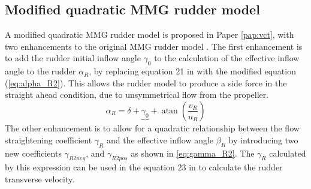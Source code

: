 \subsection{Modified quadratic MMG rudder model}
A modified quadratic MMG rudder model is proposed in Paper \ref{pap:vct}, with two enhancements to the original MMG rudder model \cite{yasukawa_introduction_2015}. The first enhancement is to add the rudder initial inflow angle $\gamma_0$ to the calculation of the effective inflow angle to the rudder $\alpha_R$, by replacing equation 21 in \textcite{yasukawa_introduction_2015} with the modified equation (\autoref{eq:alpha_R2}). This allows the rudder model to produce a side force in the straight ahead condition, due to unsymmetrical flow from the propeller. 
\begin{equation}
    \label{eq:alpha_R2}
    \alpha_{R} = \delta + \underbrace{\gamma_{0}}_{~} + \operatorname{atan}{\left(\frac{v_{R}}{u_{R}} \right)}
\end{equation}
The other enhancement is to allow for a quadratic relationship between the flow straightening coefficient $\gamma_R$ and the effective inflow angle $\beta_R$ by introducing two new coefficients $\gamma_{R2neg}$, and $\gamma_{R2pos}$ as shown in \autoref{eq:gamma_R2}. The $\gamma_R$ calculated by this expression can be used in the equation 23 in \textcite{yasukawa_introduction_2015} to calculate the rudder transverse velocity.  
\begin{equation}
    \label{eq:gamma_R2}
    
\end{equation}